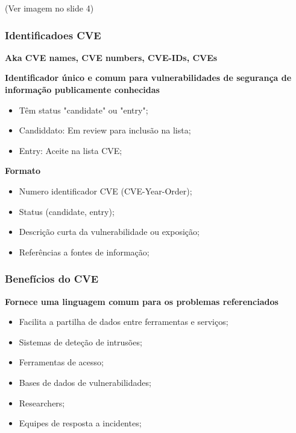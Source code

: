 \documentclass{article}
\begin{document}
  \vspace{2mm}

  (Ver imagem no slide 4)

  \subsubsection{Identificadoes CVE}

  \textbf{Aka CVE names, CVE numbers, CVE-IDs, CVEs}

  \vspace{2mm}

  \textbf{Identificador único e comum para vulnerabilidades de segurança de informação publicamente conhecidas}
  \begin{itemize}
    \item Têm status "candidate" ou "entry";
    \item Candiddato: Em review para inclusão na lista;
    \item Entry: Aceite na lista CVE;
  \end{itemize}

  \vspace{2mm}

  \textbf{Formato}
  \begin{itemize}
    \item Numero identificador CVE (CVE-Year-Order);
    \item Status (candidate, entry);
    \item Descrição curta da vulnerabilidade ou exposição;
    \item Referências a fontes de informação;
  \end{itemize}

  \subsubsection{Benefícios do CVE}

  \textbf{Fornece uma linguagem comum para os problemas referenciados}
  \begin{itemize}
    \item Facilita a partilha de dados entre ferramentas e serviços;
    \item Sistemas de deteção de intrusões;
    \item Ferramentas de acesso;
    \item Bases de dados de vulnerabilidades;
    \item Researchers;
    \item Equipes de resposta a incidentes;
  \end{itemize}
\end{document}
